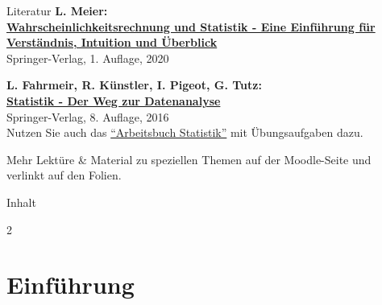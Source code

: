 \documentclass[
  10pt,
  ignorenonframetext,
]{beamer}
\begin{document}
\begin{frame}{Literatur}
\protect\hypertarget{literatur}{}
\textbf{L. Meier:}\\
\href{https://link-springer-com.emedien.ub.uni-muenchen.de/book/10.1007\%2F978-3-662-61488-4}{\textbf{Wahrscheinlichkeitsrechnung
und Statistik - Eine Einführung für Verständnis, Intuition und
Überblick}}\\
Springer-Verlag, 1. Auflage, 2020

\textbf{L. Fahrmeir, R. Künstler, I. Pigeot, G. Tutz:}\\
\href{https://link-springer-com.emedien.ub.uni-muenchen.de/book/10.1007\%2F978-3-662-50372-0}{\textbf{Statistik
- Der Weg zur Datenanalyse}}\\
Springer-Verlag, 8. Auflage, 2016\\
Nutzen Sie auch das
\href{https://link-springer-com.emedien.ub.uni-muenchen.de/book/10.1007/b138336}{``Arbeitsbuch
Statistik''} mit Übungsaufgaben dazu.

Mehr Lektüre \& Material zu speziellen Themen auf der Moodle-Seite und
verlinkt auf den Folien.
\end{frame}

\begin{frame}{Inhalt}
\protect\hypertarget{inhalt}{}
\begin{multicols}{2}
\footnotesize
\tableofcontents[subsectionstyle=hide]
\end{multicols}
\end{frame}

\hypertarget{einfuxfchrung}{%
\section{Einführung}\label{einfuxfchrung}}
\end{document}
